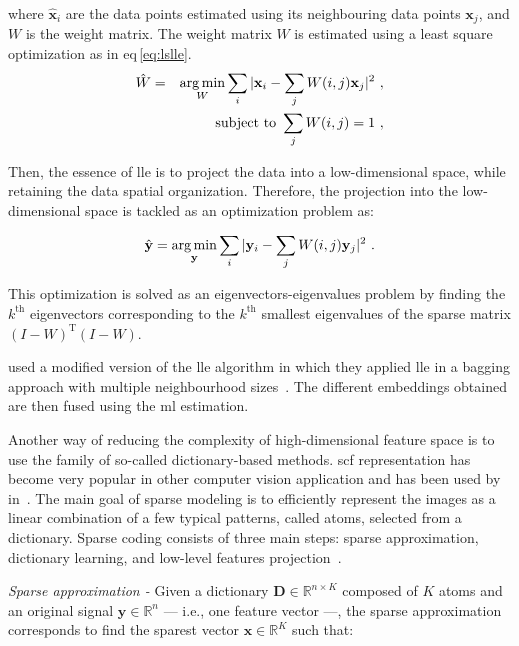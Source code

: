\noindent where $\hat{\mathbf{x}}_i$ are the data points estimated using its
neighbouring data points $\mathbf{x}_j$, and $W$ is the weight matrix.
The weight matrix $W$ is estimated using a least square optimization as in
\acs{eq}\,\eqref{eq:lslle}.
\begin{eqnarray}
  \hat{W} & = & \operatorname*{arg\,min}_{W} \sum_i | \mathbf{x}_i - \sum_j W(i,j)\mathbf{x}_j |^{2} \ , \label{eq:lslle} \\
          && \text{subject to } \sum_j W(i,j) = 1 \ , \nonumber
\end{eqnarray}

Then, the essence of \ac{lle} is to project the data into a low-dimensional
space, while retaining the data spatial organization.
Therefore, the projection into the low-dimensional space is tackled as an
optimization problem as:

\begin{equation}
  \hat{\mathbf{y}} = \operatorname*{arg\,min}_{\mathbf{y}} \sum_i | \mathbf{y}_i - \sum_j W(i,j)\mathbf{y}_j |^{2} \ .
  \label{eq:lowprojlle}
\end{equation}

This optimization is solved as an eigenvectors-eigenvalues problem by finding
the $k^{\text{th}}$ eigenvectors corresponding to the $k^{\text{th}}$ smallest
eigenvalues of the sparse matrix $(I-W)^{\text{T}}(I-W)$.

\citeauthor{Tiwari2008} used a modified version of the \ac{lle} algorithm in
which they applied \ac{lle} in a bagging approach with multiple neighbourhood
sizes~\cite{Tiwari2008}.
The different embeddings obtained are then fused using the \ac{ml} estimation.

Another way of reducing the complexity of high-dimensional feature space is to
use the family of so-called dictionary-based methods.
\Ac{scf} representation has become very popular in other computer vision
application and has been used by \citeauthor{lehaire2014computer}
in~\cite{lehaire2014computer}.
The main goal of sparse modeling is to efficiently represent the images as a
linear combination of a few typical patterns, called atoms, selected from a
dictionary.
Sparse coding consists of three main steps: sparse approximation, dictionary
learning, and low-level features projection~\cite{rubinstein2008efficient}.

\emph{Sparse approximation -} Given a dictionary $\mathbf{D} \in \mathbb{R}^{n
  \times K}$ composed of $K$ atoms and an original signal $\mathbf{y} \in
\mathbb{R}^{n}$ --- i.e., one feature vector ---, the sparse approximation
corresponds to find the sparest vector $\mathbf{x} \in \mathbb{R}^{K}$ such
that:

